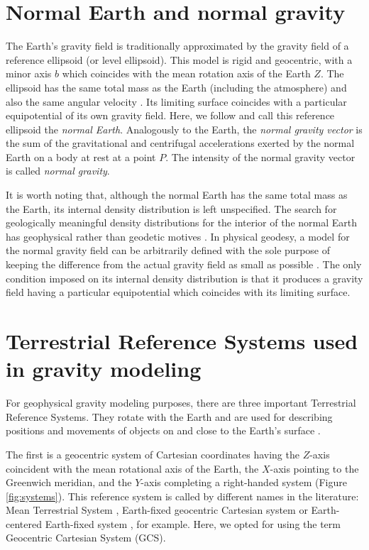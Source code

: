 \documentclass[paper,twocolumn,twoside]{geophysics}
\begin{document}
\section{Normal Earth and normal gravity}

The Earth's gravity field is traditionally approximated
by the gravity field of a reference ellipsoid (or level ellipsoid).
This model is rigid and geocentric,
with a minor axis $b$ which coincides with
the mean rotation axis of the Earth $Z$.
The ellipsoid has the same total mass as the Earth (including the atmosphere)
and also the same angular velocity \citep{heiskanen-moritz1967,
vanicek1987,hofmann-wellenhof-moritz2005,torge2012}.
Its limiting surface coincides with
a particular equipotential of its own gravity field.
Here, we follow \citep{torge2012} and call this reference ellipsoid
the \textit{normal Earth}.
Analogously to the Earth, the \textit{normal gravity vector} is
the sum of the
gravitational and centrifugal accelerations exerted by the normal
Earth on a body at rest at a point $P$.
The intensity of the normal gravity vector is called \textit{normal gravity}.

It is worth noting that, although the normal Earth has the same total mass as
the Earth, its internal density distribution is left unspecified.
The search for geologically meaningful density distributions
for the interior of the normal Earth has
geophysical rather than geodetic motives \citep{marussi1974}.
In physical geodesy, a model for the normal gravity field
can be arbitrarily defined with the sole purpose of
keeping the difference from the actual gravity field
as small as possible \citep{vanicek1987}.
The only condition imposed on its internal density
distribution is that it produces a gravity field
having a particular equipotential which coincides
with its limiting surface.


\section{Terrestrial Reference Systems used in gravity modeling}

For geophysical gravity modeling purposes, there are three important
Terrestrial Reference Systems.
They rotate with the Earth and are used for describing
positions and movements of objects on and close to the Earth's surface
\citep{torge2012}.

The first is a geocentric system of Cartesian coordinates
having the $Z$-axis coincident with the mean rotational axis of the Earth,
the $X$-axis pointing to the Greenwich meridian,
and the $Y$-axis completing a right-handed system (Figure \ref{fig:systems}).
This reference system is called by different names in the literature:
Mean Terrestrial System \citep[e.g.,][]{soler1976},
Earth-fixed geocentric Cartesian system \citep[e.g.,][]{torge2012}
or Earth-centered Earth-fixed system \citep[e.g.,][]{bouman_etal2013},
for example.
Here, we opted for using the term Geocentric Cartesian System (GCS).
\end{document}
